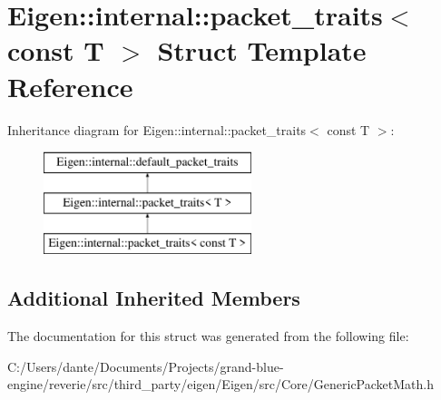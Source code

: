 \hypertarget{struct_eigen_1_1internal_1_1packet__traits_3_01const_01_t_01_4}{}\section{Eigen\+::internal\+::packet\+\_\+traits$<$ const T $>$ Struct Template Reference}
\label{struct_eigen_1_1internal_1_1packet__traits_3_01const_01_t_01_4}
Inheritance diagram for Eigen\+::internal\+::packet\+\_\+traits$<$ const T $>$\+:\begin{figure}[H]
\begin{center}
\leavevmode
\includegraphics[height=3.000000cm]{struct_eigen_1_1internal_1_1packet__traits_3_01const_01_t_01_4}
\end{center}
\end{figure}
\subsection*{Additional Inherited Members}


The documentation for this struct was generated from the following file\+:\begin{DoxyCompactItemize}
\item 
C\+:/\+Users/dante/\+Documents/\+Projects/grand-\/blue-\/engine/reverie/src/third\+\_\+party/eigen/\+Eigen/src/\+Core/Generic\+Packet\+Math.\+h\end{DoxyCompactItemize}
